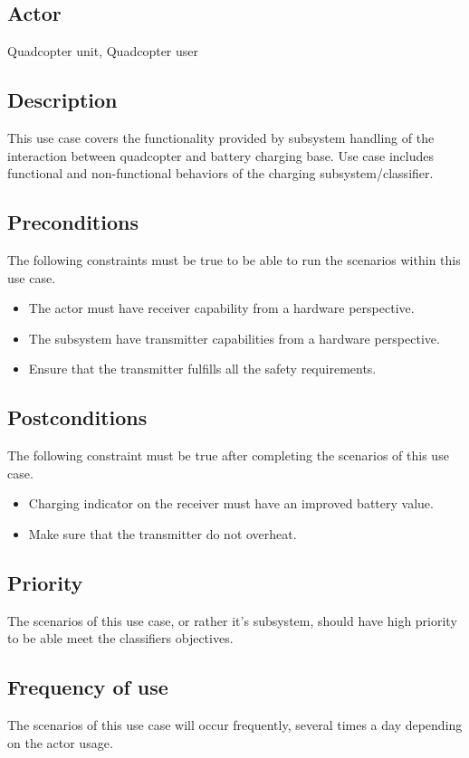\documentclass[a4paper]{article}
\begin{document}
\subsection{Actor}
Quadcopter unit, Quadcopter user
\subsection{Description}
This use case covers the functionality provided by subsystem handling of the interaction between quadcopter and battery charging base. Use case includes functional and non-functional behaviors of the charging subsystem/classifier.

\subsection{Preconditions}
The following constraints must be true to be able to run the scenarios within this use case.
\begin{itemize}
	\item The actor must have receiver capability from a hardware perspective.
	\item The subsystem have transmitter capabilities from a hardware perspective.
	\item Ensure that the transmitter fulfills all the safety requirements.
\end{itemize}
\subsection{Postconditions}
The following constraint must be true after completing the scenarios of this use case.
\begin{itemize}
	\item Charging indicator on the receiver must have an improved battery value.
	\item Make sure that the transmitter do not overheat.
\end{itemize}
\subsection{Priority}
The scenarios of this use case, or rather it's subsystem, should have high priority to be able meet the classifiers objectives.
\subsection{Frequency of use}
The scenarios of this use case will occur frequently, several times a day depending on the actor usage.
\end{document}
